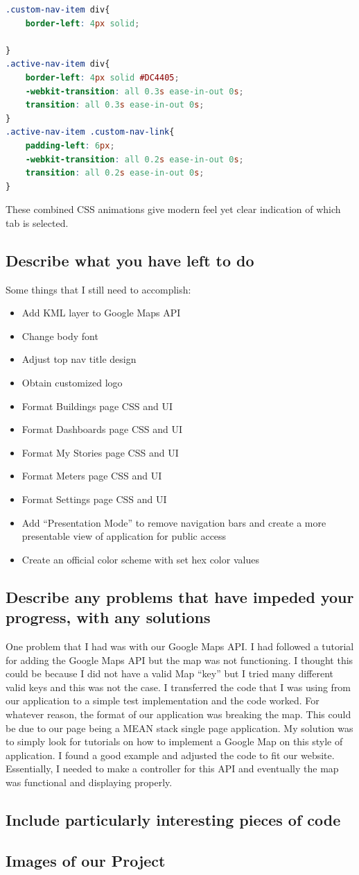 \documentclass[letterpaper,10pt,serif,draftclsnofoot,onecolumn,compsoc,titlepage]{IEEEtran}
\begin{document}
\begin{lstlisting}[caption={CSS Implementation} language=CSS]
.custom-nav-item div{
    border-left: 4px solid;
	
}
.active-nav-item div{
    border-left: 4px solid #DC4405;
    -webkit-transition: all 0.3s ease-in-out 0s;
    transition: all 0.3s ease-in-out 0s;
}
.active-nav-item .custom-nav-link{
    padding-left: 6px;
	-webkit-transition: all 0.2s ease-in-out 0s;
    transition: all 0.2s ease-in-out 0s;
}
\end{lstlisting}
	
	These combined CSS animations give modern feel yet clear indication of which tab is selected.
	
\subsection{Describe what you have left to do}
Some things that I still need to accomplish:
\begin{itemize}
  \item Add KML layer to Google Maps API
  \item Change body font
  \item Adjust top nav title design
  \item Obtain customized logo
  \item Format Buildings page CSS and UI
  \item Format Dashboards page CSS and UI
  \item Format My Stories page CSS and UI
  \item Format Meters page CSS and UI
  \item Format Settings page CSS and UI
  \item Add ``Presentation Mode'' to remove navigation bars and create a more presentable view of application for public access
  \item Create an official color scheme with set hex color values
\end{itemize}
\subsection{Describe any problems that have impeded your progress, with any solutions}
One problem that I had was with our Google Maps API. I had followed a tutorial for adding the Google Maps API but the map was not functioning. I thought this could 
be because I did not have a valid Map ``key'' but I tried many different valid keys and this was not the case. I transferred the code that I was using from our application
to a simple test implementation and the code worked. For whatever reason, the format of our application was breaking the map. This could be due to our page being a 
MEAN stack single page application. My solution was to simply look for tutorials on how to implement a Google Map on this style of application. I found a good example and 
adjusted the code to fit our website. Essentially, I needed to make a controller for this API and eventually the map was functional and displaying properly.

\subsection{Include particularly interesting pieces of code}
\subsection{Images of our Project} 


\newpage


\end{document}
